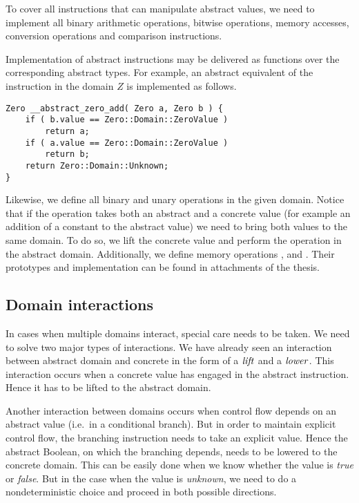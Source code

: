 To cover all \LLVM instructions that can manipulate abstract values, we need to
implement all binary arithmetic operations, bitwise operations, memory
accesses, conversion operations and comparison instructions.

Implementation of abstract instructions may be delivered as \Cpp{} functions over
the corresponding abstract types. For example, an abstract equivalent of the
 instruction in the domain $Z$ is implemented as
follows.

\begin{verbatim}
Zero __abstract_zero_add( Zero a, Zero b ) {
    if ( b.value == Zero::Domain::ZeroValue )
        return a;
    if ( a.value == Zero::Domain::ZeroValue )
        return b;
    return Zero::Domain::Unknown;
}
\end{verbatim}

Likewise, we define all binary and unary operations in the given domain. Notice
that if the operation takes both an abstract and a concrete value (for example an
addition of a constant to the abstract value) we need to bring both values to the same
domain. To do so, we lift the concrete value and perform the operation in the
abstract domain. Additionally, we define memory operations ,
 and . Their prototypes and implementation can be found
in attachments of the thesis.

\subsection{Domain interactions} \label{sec:interactions}
In cases when multiple domains interact, special care needs to be
taken. We need to solve two major types of interactions.
We have already seen an interaction between abstract domain and concrete in the form of a $\mathit{lift}$ and a $\mathit{lower}$. This interaction occurs when a concrete value
has engaged in the abstract instruction. Hence it has to be lifted to the
abstract domain.

Another interaction between domains occurs when control flow depends on an
abstract value (i.e.~in a conditional branch).  But in order to maintain
explicit control flow, the branching instruction needs to take an explicit
value. Hence the abstract Boolean, on which the branching depends, needs to be
lowered to the concrete domain. This can be easily done when we know whether the
value is \emph{true} or \emph{false}. But in the case when the value is
\emph{unknown}, we need to do a nondeterministic choice and proceed in both
possible directions.

